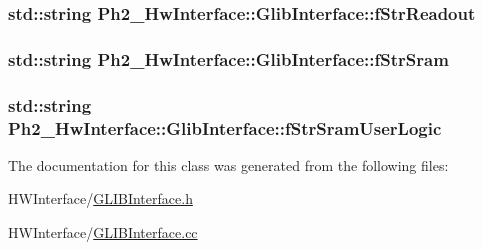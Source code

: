 \hypertarget{class_ph2___hw_interface_1_1_glib_interface_a925d65d022d0dc6d453e0e611826c377}{
\subsubsection[{f\-Str\-Readout}]{\setlength{\rightskip}{0pt plus 5cm}std\-::string Ph2\-\_\-\-Hw\-Interface\-::\-Glib\-Interface\-::f\-Str\-Readout\hspace{0.3cm}{\ttfamily [private]}}}\label{class_ph2___hw_interface_1_1_glib_interface_a925d65d022d0dc6d453e0e611826c377}
\hypertarget{class_ph2___hw_interface_1_1_glib_interface_a9e24a95e6ba16076ef8fbea1c96243f4}{
\subsubsection[{f\-Str\-Sram}]{\setlength{\rightskip}{0pt plus 5cm}std\-::string Ph2\-\_\-\-Hw\-Interface\-::\-Glib\-Interface\-::f\-Str\-Sram\hspace{0.3cm}{\ttfamily [private]}}}\label{class_ph2___hw_interface_1_1_glib_interface_a9e24a95e6ba16076ef8fbea1c96243f4}
\hypertarget{class_ph2___hw_interface_1_1_glib_interface_a27b44db1be7f8a3802ba1a5d675a9888}{
\subsubsection[{f\-Str\-Sram\-User\-Logic}]{\setlength{\rightskip}{0pt plus 5cm}std\-::string Ph2\-\_\-\-Hw\-Interface\-::\-Glib\-Interface\-::f\-Str\-Sram\-User\-Logic\hspace{0.3cm}{\ttfamily [private]}}}\label{class_ph2___hw_interface_1_1_glib_interface_a27b44db1be7f8a3802ba1a5d675a9888}


The documentation for this class was generated from the following files\-:\begin{DoxyCompactItemize}
\item 
H\-W\-Interface/\hyperlink{_g_l_i_b_interface_8h}{G\-L\-I\-B\-Interface.\-h}\item 
H\-W\-Interface/\hyperlink{_g_l_i_b_interface_8cc}{G\-L\-I\-B\-Interface.\-cc}\end{DoxyCompactItemize}
